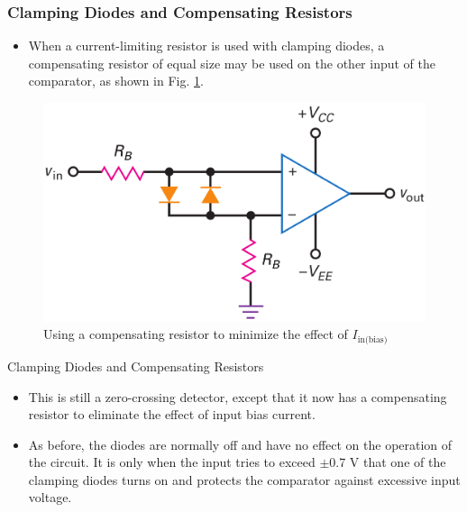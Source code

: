 \documentclass[pdflatex,compress]{beamer}
\begin{document}
\begin{frame}
	\frametitle{Clamping Diodes and Compensating Resistors}
	\begin{multicols}{2}
		\begin{itemize}
			\item When a current-limiting resistor is used with clamping diodes, a compensating resistor of equal size may be used on the other input of the comparator, as shown in Fig. \ref{fig:206}.
		\end{itemize}
		\columnbreak
		\begin{figure}
			\centering
			\includegraphics[width=\linewidth]{img/206}
			\caption{Using a compensating resistor to minimize the effect of $I_\text{in(bias)}$}
			\label{fig:206}
		\end{figure}
	\end{multicols}
\end{frame}

\begin{frame}{Clamping Diodes and Compensating Resistors}
	\begin{itemize}
		\item This is still a zero-crossing detector, except that it now has a compensating resistor to eliminate the effect of input bias current.
		\item As before, the diodes are normally off and have no effect on the operation of the circuit.
		It is only when the input tries to exceed $\pm$0.7 V that one of the clamping diodes turns on and protects the comparator against excessive input voltage.
	\end{itemize}
\end{frame}
\end{document}
